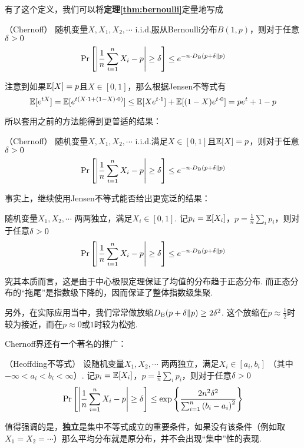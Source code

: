 有了这个定义，我们可以将\textbf{定理\ref{thm:bernoulli}}定量地写成 
\begin{theorem} （Chernoff）
    随机变量$X, X_1, X_2, \cdots$ i.i.d.服从Bernoulli分布$B(1,p)$，则对于任意$\delta > 0$ 
    \[
    \Pr\left[
        \left\vert
            \dfrac 1n \sum_{i=1}^n X_i - p
        \right\vert \ge \delta
    \right] \le e^{-n\cdot D_{\mathrm{B}}(p + \delta \| p)}
    \]
\end{theorem}

注意到如果$\mathbb{E}[X]=p$且$X \in [0,1]$，那么根据Jensen不等式有 
\[
\mathbb{E}[e^{tX}] = \mathbb{E}[e^{t(X\cdot 1 + (1-X)\cdot 0)}] \le \mathbb{E}[Xe^{t\cdot 1}] + \mathbb{E}[(1-X)e^{t\cdot 0}] =pe^t + 1-p
\]

所以套用之前的方法能得到更普适的结果：
\begin{corollary} （Chernoff）
    随机变量$X, X_1, X_2, \cdots$ i.i.d.满足$X\in [0, 1]$且$\mathbb{E}[X]=p$，则对于任意$\delta > 0$ 
    \[
    \Pr\left[
        \left\vert
            \dfrac 1n \sum_{i=1}^n X_i - p
        \right\vert \ge \delta
    \right] \le e^{-n\cdot D_{\mathrm{B}}(p + \delta \| p)}
    \]
\end{corollary}

事实上，继续使用Jensen不等式能否给出更宽泛的结果：
\begin{corollary} 
    随机变量$X_1, X_2, \cdots$ 两两独立，满足$X_i\in [0,1]$. 记$p_i = \mathbb{E}[X_i]$，$p = \frac{1}{n}\sum_i p_i$，则对于任意$\delta > 0$
    \[
    \Pr\left[
        \left\vert
            \dfrac 1n \sum_{i=1}^n X_i - p
        \right\vert \ge \delta
    \right] \le e^{-n\cdot D_{\mathrm{B}}(p + \delta \| p)}
    \]
\end{corollary}

究其本质而言，这是由于中心极限定理保证了均值的分布趋于正态分布. 而正态分布的“拖尾”是指数级下降的，因而保证了整体指数级集聚.

另外，在实际应用当中，我们常常做放缩$D_{\mathrm{B}}(p+\delta \| p) \ge 2\delta^2$. 这个放缩在$p \approx \frac 12$时较为接近，而在$p\approx 0$或$1$时较为松弛.

Chernoff界还有一个著名的推广：
\begin{theorem} （Heoffding不等式）
    设随机变量$X_1, X_2, \cdots$ 两两独立，满足$X_i\in [a_i, b_i]$ （其中$-\infty < a_i < b_i < \infty$）. 记$p_i = \mathbb{E}[X_i]$，$p = \frac{1}{n}\sum_i p_i$，则对于任意$\delta > 0$
    \[
    \Pr\left[
        \left\vert
            \dfrac 1n \sum_{i=1}^n X_i - p
        \right\vert \ge \delta
    \right] \le \exp\left\{
        \dfrac{2n^2\delta^2}{\sum_{i=1}^n {(b_i - a_i)}^2}
    \right\}
    \]
\end{theorem}

值得强调的是，\textbf{独立}是集中不等式成立的重要条件，如果没有该条件（例如取$X_1 = X_2 = \cdots$）那么平均分布就是原分布，并不会出现“集中”性的表现.

